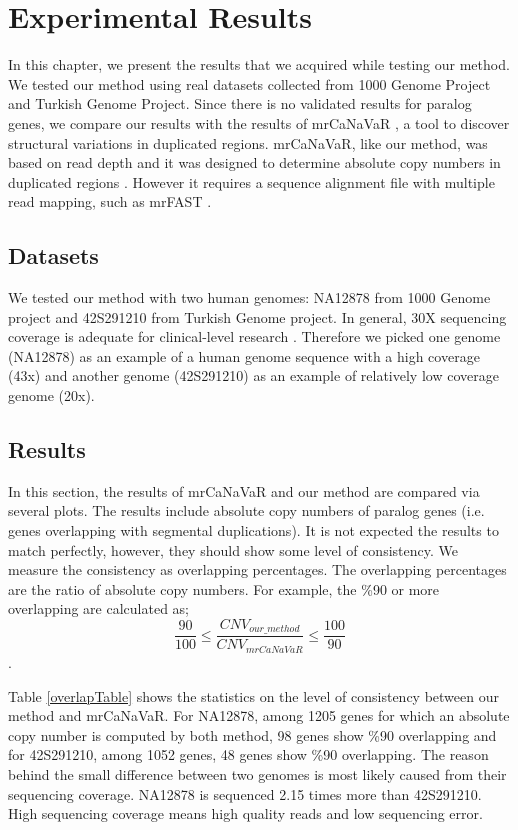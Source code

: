 \chapter{Experimental Results}

In this chapter, we present the results that we acquired while testing our method. We tested our method using real datasets collected from 1000 Genome Project and Turkish Genome Project. Since there is no validated results for paralog genes, we compare our results with the results of mrCaNaVaR \cite{alkan2009personalized}, a tool to discover structural variations in duplicated regions. mrCaNaVaR, like our method, was based on read depth and it was designed to determine absolute copy numbers in duplicated regions \cite{kahveci2018whole}. However it requires a sequence alignment file with multiple read mapping, such as mrFAST \cite{alkan2009personalized}.


\section{Datasets}
We tested our method with two human genomes: NA12878 from 1000 Genome project and 42S291210 from Turkish Genome project. In general, 30X sequencing coverage is adequate for clinical-level research \cite{shevchenko2016clinical}. Therefore we picked one genome (NA12878) as an example of a human genome sequence with a high coverage (43x) and another genome (42S291210) as an example of relatively low coverage genome (20x).

\section{Results}
In this section, the results of mrCaNaVaR and our method are compared via several plots. The results include absolute copy numbers of paralog genes (i.e. genes overlapping with segmental duplications). It is not expected the results to match perfectly, however, they should show some level of consistency. We measure the consistency as overlapping percentages. The overlapping percentages are the ratio of absolute copy numbers. For example, the \%90 or more overlapping are calculated  as; $$\frac{90}{100} \leq \frac{CNV_{our\_method}}{CNV_{mrCaNaVaR}} \leq \frac{100}{90} $$.


Table \ref{overlapTable} shows the statistics on the level of consistency between our method and mrCaNaVaR. 
For NA12878, among 1205 genes for which an absolute copy number is computed by both method, 98 genes show \%90 overlapping and for 42S291210, among 1052 genes, 48 genes show \%90 overlapping. The reason behind the small difference between two genomes is most likely caused from their sequencing coverage. NA12878 is sequenced 2.15 times more than 42S291210. High sequencing coverage means high quality reads and low sequencing error. 

